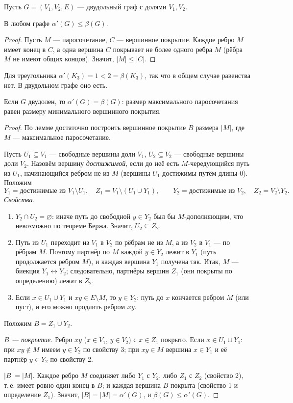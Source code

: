 Пусть \(G=(V_1,V_2,E)\) — двудольный граф с долями \(V_1,V_2\).
\begin{lemma}
В любом графе \(\alpha'(G)\le\beta(G)\).
\end{lemma}
\begin{proof}
Пусть \(M\) — паросочетание, \(C\) — вершинное покрытие. Каждое ребро \(M\)
имеет конец в \(C\), а одна вершина \(C\) покрывает не более одного ребра \(M\)
(рёбра \(M\) не имеют общих концов). Значит, \(|M|\le|C|\).
\end{proof}
Для треугольника \(\alpha'(K_3)=1<2=\beta(K_3)\), так что в общем случае
равенства нет. В двудольном графе оно есть.

\begin{theorem}[Кёниг, 1931]
Если \(G\) двудолен, то \(\alpha'(G)=\beta(G)\): размер максимального
паросочетания равен размеру минимального вершинного покрытия.
\end{theorem}
\begin{proof}
По лемме достаточно построить вершинное покрытие \(B\) размера \(|M|\),
где \(M\) — максимальное паросочетание.

Пусть \(U_1\subseteq V_1\) — свободные вершины доли \(V_1\), \(U_2\subseteq V_2\) —
свободные вершины доли \(V_2\). Назовём вершину \emph{достижимой}, если до неё
есть \(M\)-чередующийся путь из \(U_1\), начинающийся ребром не из \(M\)
(вершины \(U_1\) достижимы путём длины 0). Положим
\[
Y_1=\text{достижимые из }V_1\setminus U_1,\quad Z_1=V_1\setminus(U_1\cup Y_1),\qquad
Y_2=\text{достижимые из }V_2,\quad Z_2=V_2\setminus Y_2 .
\]
\textit{Свойства.}
\begin{enumerate}\tightlist
\item \(Y_2\cap U_2=\varnothing\): иначе путь до свободной \(y\in Y_2\) был бы
  \(M\)-дополняющим, что невозможно по теореме Бержа. Значит, \(U_2\subseteq Z_2\).
\item Путь из \(U_1\) переходит из \(V_1\) в \(V_2\) по рёбрам не из \(M\), а из
  \(V_2\) в \(V_1\) — по рёбрам \(M\). Поэтому партнёр по \(M\) каждой
  \(y\in Y_2\) лежит в \(Y_1\) (путь продолжается ребром \(M\)), и каждая
  вершина \(Y_1\) получена так. Итак, \(M\) — биекция \(Y_1\leftrightarrow Y_2\);
  следовательно, партнёры вершин \(Z_1\) (они покрыты по определению) лежат в \(Z_2\).
\item Если \(x\in U_1\cup Y_1\) и \(xy\in E\setminus M\), то \(y\in Y_2\): путь до \(x\)
  кончается ребром \(M\) (или пуст), и его можно продлить ребром \(xy\).
\end{enumerate}
Положим \(B=Z_1\cup Y_2\).

\emph{\(B\) — покрытие.} Ребро \(xy\) (\(x\in V_1\), \(y\in V_2\)) с \(x\in Z_1\)
покрыто. Если \(x\in U_1\cup Y_1\): при \(xy\notin M\) имеем \(y\in Y_2\) по
свойству 3; при \(xy\in M\) вершина \(x\in Y_1\) и её партнёр \(y\in Y_2\) по
свойству 2.

\emph{\(|B|=|M|\).} Каждое ребро \(M\) соединяет либо \(Y_1\) с \(Y_2\), либо
\(Z_1\) с \(Z_2\) (свойство 2), т.\,е. имеет ровно один конец в \(B\);
и каждая вершина \(B\) покрыта (свойство 1 и определение \(Z_1\)).
Значит, \(|B|=|M|=\alpha'(G)\), и \(\beta(G)\le\alpha'(G)\).
\end{proof}


